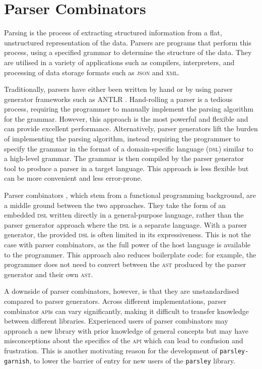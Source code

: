\chapter{Parser Combinators}

Parsing is the process of extracting structured information from a flat, unstructured representation of the data.
Parsers are programs that perform this process, using a specified grammar to determine the structure of the data.
They are utilised in a variety of applications such as compilers, interpreters, and processing of data storage formats such as \textsc{json} and \textsc{xml}.

Traditionally, parsers have either been written by hand or by using parser generator frameworks such as ANTLR \cite{parr_antlr_2013}.
Hand-rolling a parser is a tedious process, requiring the programmer to manually implement the parsing algorithm for the grammar.
However, this approach is the most powerful and flexible and can provide excellent performance.
Alternatively, parser generators lift the burden of implementing the parsing algorithm, instead requiring the programmer to specify the grammar in the format of a domain-specific language (\textsc{dsl}) similar to a high-level grammar.
The grammar is then compiled by the parser generator tool to produce a parser in a target language.
This approach is less flexible but can be more convenient and less error-prone.

Parser combinators \cite{hutton_higher-order_1992}, which stem from a functional programming background, are a middle ground between the two approaches.
They take the form of an embedded \textsc{dsl} written directly in a general-purpose language, rather than the parser generator approach where the \textsc{dsl} is a separate language.
With a parser generator, the provided \textsc{dsl} is often limited in its expressiveness.
This is not the case with parser combinators, as the full power of the host language is available to the programmer.
This approach also reduces boilerplate code: for example, the programmer does not need to convert between the \textsc{ast} produced by the parser generator and their own \textsc{ast}.

A downside of parser combinators, however, is that they are unstandardised compared to parser generators.
Across different implementations, parser combinator \textsc{api}s can vary significantly, making it difficult to transfer knowledge between different libraries.
Experienced users of parser combinators may approach a new library with prior knowledge of general concepts but may have misconceptions about the specifics of the \textsc{api} which can lead to confusion and frustration.
This is another motivating reason for the development of \texttt{parsley-garnish}, to lower the barrier of entry for new users of the \texttt{parsley} library.

